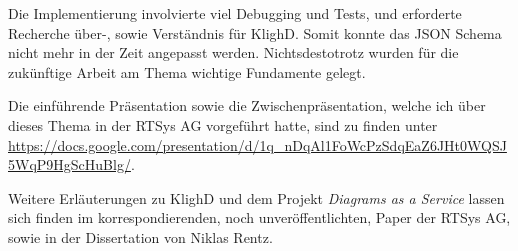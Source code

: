     Die Implementierung involvierte viel Debugging und Tests, und erforderte Recherche über-, sowie Verständnis für KlighD.
    Somit konnte das JSON Schema nicht mehr in der Zeit angepasst werden.
    Nichtsdestotrotz wurden für die zukünftige Arbeit am Thema wichtige Fundamente gelegt.
    
    Die einführende Präsentation sowie die Zwischenpräsentation, welche ich über dieses Thema in der RTSys AG vorgeführt hatte, sind zu finden unter \url{https://docs.google.com/presentation/d/1q_nDqAl1FoWcPzSdqEaZ6JHt0WQSJ5WqP9HgScHuBlg/}.

    Weitere Erläuterungen zu KlighD und dem Projekt \emph{Diagrams as a Service} lassen sich finden im korrespondierenden, noch unveröffentlichten, Paper der RTSys AG, sowie in der Dissertation von Niklas Rentz.


